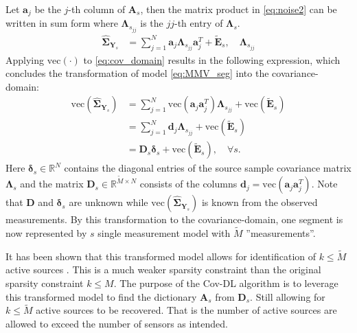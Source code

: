 Let $\mathbf{a}_j$ be the $j$-th column of $\mathbf{A}_s$, then the matrix product in \eqref{eq:noise2} can be written in sum form where $\boldsymbol{\Lambda}_{s_{jj}}$ is the $jj$-th entry of $\boldsymbol{\Lambda}_s$. 
\begin{align}
\widehat{\boldsymbol{\Sigma}}_{\mathbf{Y}_s} &= \sum_{j=1}^{N} \mathbf{a}_j \boldsymbol{\Lambda}_{s_{jj}} \mathbf{a}_j^{T} + \widetilde{\mathbf{E}}_s, \quad \boldsymbol{\Lambda}_{s_{jj}} \label{eq:cov_domain}
\end{align}
Applying $\text{vec}(\cdot)$ to \eqref{eq:cov_domain} results in the following expression, which concludes the transformation of model \eqref{eq:MMV_seg} into the covariance-domain: 
\begin{align}
\text{vec} \left(\widehat{\boldsymbol{\Sigma}}_{\mathbf{Y}_s} \right) &= \sum_{j=1}^N \text{vec}\left(\mathbf{a}_j \mathbf{a}_j^T\right) \boldsymbol{\Lambda}_{s_{jj}} + \text{vec}\left(\widetilde{\mathbf{E}}_s\right) \nonumber \\
&= \sum_{j=1}^N \mathbf{d}_j \boldsymbol{\Lambda}_{s_{jj}} + \text{vec}\left(\widetilde{\mathbf{E}}_s\right) \nonumber \\
&= \mathbf{D}_s \boldsymbol{\delta}_s + \text{vec}\left(\widetilde{\mathbf{E}}_s\right), \quad \forall s. \label{eq:cov1}
\end{align}
Here $\boldsymbol{\delta}_s \in \mathbb{R}^{N}$ contains the diagonal entries of the source sample covariance matrix $\boldsymbol{\Lambda}_s$ and the matrix $\mathbf{D}_s \in \mathbb{R}^{\widetilde{M} \times N}$ consists of the columns $\mathbf{d}_j = \text{vec}\left(\mathbf{a}_j \mathbf{a}_j^T\right)$. 
Note that $\mathbf{D}$ and $\boldsymbol{\delta}_s$ are unknown while $\text{vec}\left( \widehat{\boldsymbol{\Sigma}}_{\mathbf{Y}_s}\right)$ is known from the observed measurements.
By this transformation to the covariance-domain, one segment is now represented by $s$ single measurement model with $\widetilde{M}$ ''measurements''. 

It has been shown that this transformed model allows for identification of $k \leq \widetilde{M}$ active sources \cite{Pal2015}. This is a much weaker sparsity constraint than the original sparsity constraint $k \leq M$. 
The purpose of the Cov-DL algorithm is to leverage this transformed model to find the dictionary $\mathbf{A}_s$ from $\mathbf{D}_s$. Still allowing for $k \leq \widetilde{M}$ active sources to be recovered. 
That is the number of active sources are allowed to exceed the number of sensors as intended.

